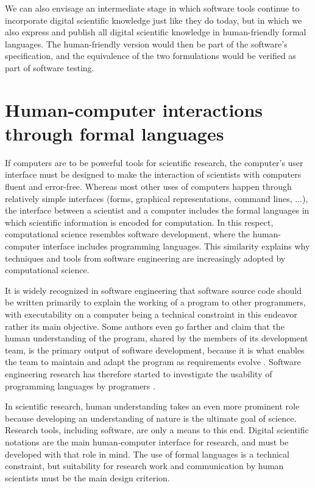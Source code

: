 We can also envisage an intermediate stage in which software tools continue to incorporate digital scientific knowledge just like they do today, but in which we also express and publish all digital scientific knowledge in human-friendly formal languages. The human-friendly version would then be part of the software's specification, and the equivalence of the two formulations would be verified as part of software testing.

\section{Human-computer interactions through formal languages}
\label{HCI}

If computers are to be powerful tools for scientific research, the computer's user interface must be designed to make the interaction of scientists with computers fluent and error-free. Whereas most other uses of computers happen through relatively simple interfaces (forms, graphical representations, command lines, ...), the interface between a scientist and a computer includes the formal languages in which scientific information is encoded for computation. In this respect, computational science resembles software development, where the human-computer interface includes programming languages. This similarity explains why techniques and tools from software engineering are increasingly adopted by computational science.

It is widely recognized in software engineering that software source code should be written primarily to explain the working of a program to other programmers, with executability on a computer being a technical constraint in this endeavor rather its main objective. Some authors even go farther and claim that the human understanding of the program, shared by the members of its development team, is the primary output of software development, because it is what enables the team to maintain and adapt the program as requirements evolve \cite{naur_programming_1985}. Software engineering research has therefore started to investigate the usability of programming languages by programers \cite{_plateau_2010}.

In scientific research, human understanding takes an even more prominent role because developing an understanding of nature is the ultimate goal of science. Research tools, including software, are only a means to this end. Digital scientific notations are the main human-computer interface for research, and must be developed with that role in mind. The use of formal languages is a technical constraint, but suitability for research work and communication by human scientists must be the main design criterion.

